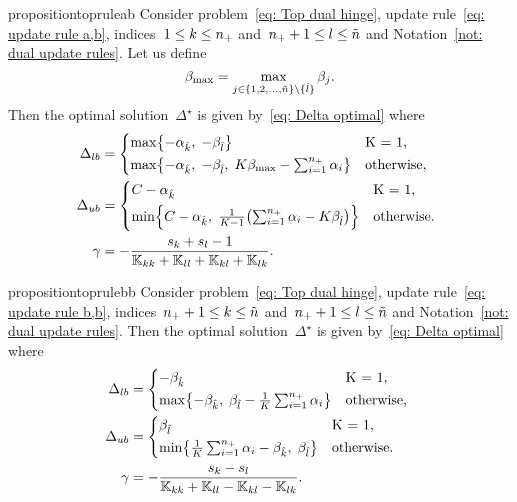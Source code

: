 \begin{restatable}{proposition}{topruleab}\label{prop: toppushk family hinge update a,b}
  Consider problem~\eqref{eq: Top dual hinge}, update rule~\eqref{eq: update rule a,b}, indices~$1 \leq k \leq n_{+}$ and~$n_{+} + 1 \leq l \leq \tilde{n}$ and Notation~\ref{not: dual update rules}. Let us define
  \begin{equation*}
    \beta_{\max} = \max_{j \in \{1, 2, \ldots, \tilde{n} \} \setminus \{\hat{l}\}} \beta_j.
  \end{equation*}
  Then the optimal solution~$\Delta^{\star}$ is given by~\eqref{eq: Delta optimal} where
  \begin{align*}
    \Delta_{lb} & = 
      \begin{cases*}
        \max \Brac[c]{- \alphak, \;  -\betal} & K = 1, \\
        \max \Brac[c]{- \alphak, \;  -\betal, \; K\beta_{\max} - \sum_{i = 1}^{\npos} \alpha_i} & \textrm{otherwise},
      \end{cases*} \\
    \Delta_{ub} & = 
      \begin{cases*}
          C - \alphak & K = 1, \\
          \min \Brac[c]{C - \alphak, \; \frac{1}{K-1}\Brac{\sum_{i = 1}^{\npos} \alpha_i - K \betal}}  & \textrm{otherwise}.
      \end{cases*} \\
    \gamma & = - \frac{s_k + s_l - 1}{\K_{kk} + \K_{ll} + \K_{kl} + \K_{lk}}.
  \end{align*}
\end{restatable}

\begin{restatable}{proposition}{toprulebb}\label{prop: toppushk family hinge update b,b}
  Consider problem~\eqref{eq: Top dual hinge}, update rule~\eqref{eq: update rule b,b}, indices~$n_{+} + 1 \leq k \leq \tilde{n}$ and~$n_{+} + 1 \leq l \leq \tilde{n}$ and Notation~\ref{not: dual update rules}. Then the optimal solution~$\Delta^{\star}$ is given by~\eqref{eq: Delta optimal} where
  \begin{align*}
    \Delta_{lb} & = 
      \begin{cases*}
        - \betak & K = 1, \\
        \max \Brac[c]{- \betak,\; \betal - \frac{1}{K} \sum_{i = 1}^{\npos} \alpha_i} & \textrm{otherwise},
      \end{cases*} \\
    \Delta_{ub} & = 
      \begin{cases*}
        \betal & K = 1, \\
        \min \Brac[c]{\frac{1}{K} \sum_{i = 1}^{\npos} \alpha_i - \betak,\; \betal} & \textrm{otherwise}.
      \end{cases*} \\
    \gamma & = -\frac{s_k - s_l}{\K_{kk} + \K_{ll} - \K_{kl} - \K_{lk}}.
  \end{align*}
\end{restatable}

